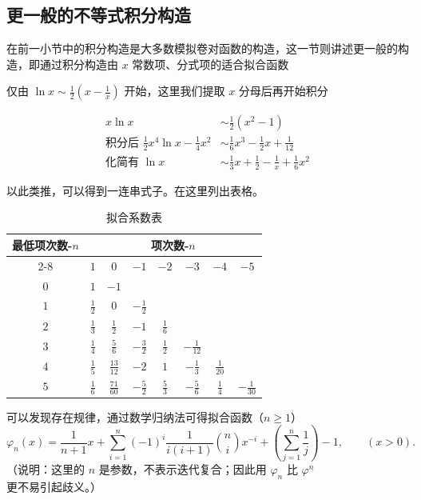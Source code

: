 \documentclass[12pt]{article}
\theoremstyle{definition}
\theoremstyle{plain}
\theoremstyle{definition}
\begin{document}
\subsection{更一般的不等式积分构造}

在前一小节中的积分构造是大多数模拟卷对函数的构造，这一节则讲述更一般的构造，即通过积分构造由
\(x\) 常数项、分式项的适合拟合函数

仅由 \(\ln x \sim \frac{1}{2}\left( x - \frac{1}{x} \right)\)
开始，这里我们提取 \(x\) 分母后再开始积分

\begin{align*}
x\ln x &\sim \frac{1}{2}\left( x^{2} - 1 \right) \\
\text{积分后 } \frac{1}{2}x^{4}\ln x - \frac{1}{4}x^{2} &\sim \frac{1}{6}x^{3} - \frac{1}{2}x + \frac{1}{12} \\
\text{化简有 } \ln x &\sim \frac{1}{3}x + \frac{1}{2} - \frac{1}{x} + \frac{1}{6}x^{2}
\end{align*}

以此类推，可以得到一连串式子。在这里列出表格。

\begin{table}[htbp]
\centering
\caption{拟合系数表}
\begin{tabular}{c|ccccccc}
\toprule
\multirow{2}{*}{最低项次数-$n$} & \multicolumn{7}{c}{项次数-$n$} \\
\cmidrule(lr){2-8}
 & $1$ & $0$ & $-1$ & $-2$ & $-3$ & $-4$ & $-5$ \\
\midrule
$0$ & $1$ & $-1$ & & & & & \\
$1$ & $\frac{1}{2}$ & $0$ & $-\frac{1}{2}$ & & & & \\
$2$ & $\frac{1}{3}$ & $\frac{1}{2}$ & $-1$ & $\frac{1}{6}$ & & & \\
$3$ & $\frac{1}{4}$ & $\frac{5}{6}$ & $-\frac{3}{2}$ & $\frac{1}{2}$ & $-\frac{1}{12}$ & & \\
$4$ & $\frac{1}{5}$ & $\frac{13}{12}$ & $-2$ & $1$ & $-\frac{1}{3}$ & $\frac{1}{20}$ & \\
$5$ & $\frac{1}{6}$ & $\frac{71}{60}$ & $-\frac{5}{2}$ & $\frac{5}{3}$ & $-\frac{5}{6}$ & $\frac{1}{4}$ & $-\frac{1}{30}$ \\
\bottomrule
\end{tabular}
\end{table}

可以发现存在规律，通过数学归纳法可得拟合函数（$n\ge 1$）
\[
\varphi_{n}(x)= \frac{1}{n+1}x+\sum_{i=1}^{n}(-1)^{i}\frac{1}{i(i+1)}\binom{n}{i}x^{-i}
+\left(\sum_{j=1}^{n}\frac{1}{j}\right)-1,\qquad (x>0).
\]
（说明：这里的 $n$ 是参数，不表示迭代复合；因此用 $\varphi_n$ 比 $\varphi^{n}$ 更不易引起歧义。）
\end{document}
